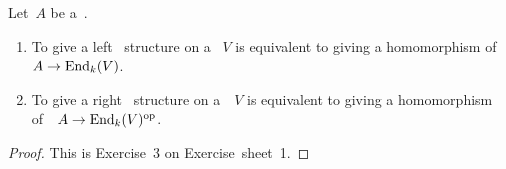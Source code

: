 \begin{proposition}
  \label{modules as homomorphisms into endomorphisms}
  Let~$A$ be a~{\kalg}.
  \begin{enumerate}
    \item
      To give a left~{} structure on a~{\module{$\kf$}} $V$ is equivalent to giving a homomorphism of~{\kalg}~$A \to \operatorname{End}_k(V)$.
    \item
      To give a right~{} structure on a~{\module{$\kf$}}~$V$ is equivalent to giving a homomorphism of~{\kalg}~$A \to \operatorname{End}_k(V)^{\mathrm{op}}$.
  \end{enumerate}
\end{proposition}


\begin{proof}
  This is Exercise~3 on Exercise~sheet~1.
\end{proof}




